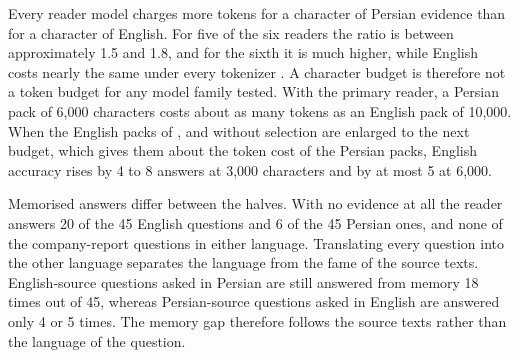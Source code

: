 Every reader model charges more tokens for a character of Persian evidence than for a character of English. For five of the six readers the ratio is between approximately 1.5 and 1.8, and for the sixth it is much higher, while English costs nearly the same under every tokenizer \citep{petrov2023tokenizers,ahia2023cost}. A character budget is therefore not a token budget for any model family tested. With the primary reader, a Persian pack of 6,000 characters costs about as many tokens as an English pack of 10,000. %
When the English packs of \hybrid{}, \hr{} and \lexb{} without selection are enlarged to the next budget, which gives them about the token cost of the Persian packs, English accuracy rises by 4 to 8 answers at 3,000 characters and by at most 5 at 6,000.

Memorised answers differ between the halves. With no evidence at all the reader answers 20 of the 45 English questions and 6 of the 45 Persian ones, and none of the company-report questions in either language. Translating every question into the other language separates the language from the fame of the source texts. English-source questions asked in Persian are still answered from memory 18 times out of 45, whereas Persian-source questions asked in English are answered only 4 or 5 times. The memory gap therefore follows the source texts rather than the language of the question.

